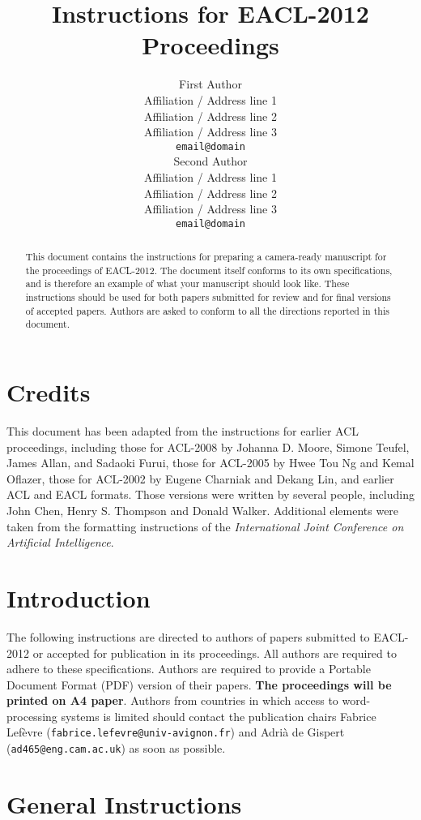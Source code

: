 \documentclass[11pt]{article}
\title{Instructions for EACL-2012 Proceedings}
\author{First Author \\
  Affiliation / Address line 1 \\
  Affiliation / Address line 2 \\
  Affiliation / Address line 3 \\
  {\tt email@domain} \\\And
  Second Author \\
  Affiliation / Address line 1 \\
  Affiliation / Address line 2 \\
  Affiliation / Address line 3 \\
  {\tt email@domain} \\}
\date{}
\begin{document}
\maketitle
\begin{abstract}
  This document contains the instructions for preparing a camera-ready manuscript for the proceedings of EACL-2012. The document itself conforms to its own specifications, and is therefore an example of what your manuscript should look like. These instructions should be used for both papers submitted for review and for final versions of accepted papers. Authors are asked to conform to all the directions reported in this document.
\end{abstract}

\section{Credits}

This document has been adapted from the instructions for earlier ACL proceedings, including those for ACL-2008 by Johanna D. Moore, Simone Teufel, James Allan, and Sadaoki Furui, those for ACL-2005 by Hwee Tou Ng and Kemal Oflazer, those for ACL-2002 by Eugene Charniak and Dekang Lin, and earlier ACL and EACL formats. Those versions were written by several people, including John Chen, Henry S. Thompson and Donald Walker. Additional elements were taken from the formatting instructions of the {\em International Joint Conference on Artificial Intelligence}.

\section{Introduction}

The following instructions are directed to authors of papers submitted to EACL-2012 or accepted for publication in its proceedings. All authors are required to adhere to these specifications. Authors are required to provide a Portable Document Format (PDF)
version of their papers. \textbf{The proceedings will be printed on A4 paper}. Authors from countries in which access to word-processing systems is limited should contact the publication chairs Fabrice Lef\`evre ({\tt fabrice.lefevre@univ-avignon.fr}) and Adri\`a de Gispert ({\tt ad465@eng.cam.ac.uk}) as soon as possible.


\section{General Instructions}
\end{document}
